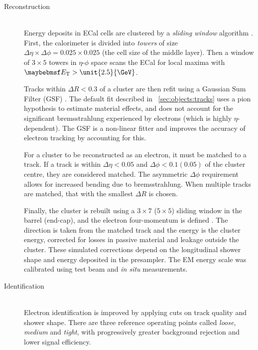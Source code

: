 \begin{description}
\item[Reconstruction] \hfill \\
	Energy deposits in \ac{ECal} cells are clustered by a \textit{sliding window} 
	algorithm \cite{ElectronPerf:Expect}. First, the calorimeter is divided into 
	\textit{towers} of size $\Delta\eta \times \Delta\phi = 0.025 \times 0.025$ (the 
	cell size of the middle layer). Then a window of $3 \times 5$ towers in $\eta$-$\phi$ 
	space scans the \ac{ECal} for local maxima with $\et > \unit{2.5}{\GeV}$.

	Tracks within $\Delta R < 0.3$ of a cluster are then refit using a Gaussian Sum 
	Filter (GSF) \cite{Electron:GSF}. The default fit described in 
	\Section~\ref{sec:objects:tracks} uses a pion hypothesis to estimate material 
	effects, and does not account for the significant bremsstrahlung experienced by 
	electrons (which is highly $\eta$-dependent). The GSF is a non-linear fitter and 
	improves the accuracy of electron tracking by accounting for this.

	For a cluster to be reconstructed as an electron, it must be matched to a track. If a 
	track is within $\Delta\eta < 0.05$ and $\Delta\phi < 0.1 (0.05)$ of the cluster 
	centre, they are considered matched. The asymmetric $\Delta\phi$ requirement allows 
	for increased bending due to bremsstrahlung. When multiple tracks are matched, that 
	with the smallest $\Delta R$ is chosen.

	Finally, the cluster is rebuilt using a $3 \times 7$ ($5 \times 5$) sliding window 
	in the barrel (end-cap), and the electron four-momentum is defined 
	\cite{ElectronPerf:2010}. The direction is taken from the matched track and the 
	energy is the cluster energy, corrected for losses in passive material and leakage 
	outside the cluster. These simulated corrections depend on the longitudinal shower 
	shape and energy deposited in the presampler. The EM energy scale was calibrated
	using test beam and \textit{in situ} \HepProcess{\PZ \HepTo \Pe\Pe} measurements.
\item[Identification] \hfill \\
	Electron identification is improved by applying cuts on track quality and shower 
	shape. There are three reference operating points called \textit{loose}, 
	\textit{medium} and \textit{tight}, with progressively greater background rejection 
	and lower signal efficiency.
	

\end{description}
